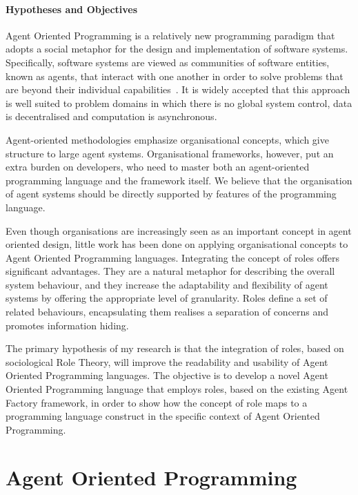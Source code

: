 \documentclass[a4paper,12pt,oneside,fleqn]{book} %
\newcommand{\rg}[1]{\marginpar{\tiny\raggedright\textcolor{blue}{\bf rg:} #1}}
\begin{document}
\subsubsection{Hypotheses and Objectives}
Agent Oriented Programming is a relatively new programming paradigm that
adopts a social metaphor for the design and implementation of software
systems.  Specifically, software systems are viewed as communities of
software entities, known as agents, that interact with one another in order
to solve problems that are beyond their individual
capabilities~\cite{DBLP:journals/ai/Shoham93}. It is widely accepted that
this approach is well suited to problem domains in which there is no global
system control, data is decentralised and computation is asynchronous.

Agent-oriented methodologies emphasize organisational concepts, which give
structure to large agent systems. Organisational frameworks, however, put
an extra burden on developers, who need to master both an agent-oriented
programming language and the framework itself. We believe that the
organisation of agent systems should be directly supported by features of
the programming language.

Even though organisations are increasingly seen as an important concept in
agent oriented design, little work has been done on applying organisational
concepts to Agent Oriented Programming languages. Integrating the concept
of roles offers significant advantages. They are a natural metaphor for
describing the overall system behaviour, and they increase the adaptability
and flexibility of agent systems by offering the appropriate level of
granularity. Roles define a set of related behaviours, encapsulating them
realises a separation of concerns and promotes information hiding.

The primary hypothesis of my research is that the integration of roles,
based on sociological Role Theory, will improve the readability and
usability of Agent Oriented Programming languages. The objective is to
develop a novel Agent Oriented Programming language that employs roles,
based on the existing Agent Factory framework, in order to show how the
concept of role maps to a programming language construct in the specific
context of Agent Oriented Programming.  



\chapter{Agent Oriented Programming}\label{ch:aop} %
\end{document}

